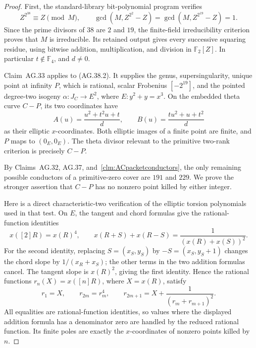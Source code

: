 \begin{proof}
First, the standard-library bit-polynomial program
 verifies
\[
 Z^{2^{38}}\equiv Z\pmod M,
 \qquad
 \gcd(M,Z^{2^2}-Z)=\gcd(M,Z^{2^{19}}-Z)=1.
                                                               \tag{AG.38.3}
\]
Since the prime divisors of \(38\) are \(2\) and \(19\),
the finite-field irreducibility criterion proves that \(M\) is
irreducible. Its retained output gives every successive squaring
residue, using bitwise addition, multiplication, and division in
\(\mathbb F_2[Z]\). In particular \(t\notin\mathbb F_4\),
and \(d\ne0\).

Claim~AG.33 applies to (AG.38.2). It supplies the genus,
supersingularity, unique point at infinity \(P\), which is rational,
scalar Frobenius
\([-2^{19}]\), and the pointed degree-two isogeny
\(\alpha:J_C\to E^2\), where \(E:y^2+y=x^3\). On the
embedded theta curve \(C-P\), its two coordinates have
\[
 A(u)=\frac{u^2+t^2u+t}{d},\qquad
 B(u)=\frac{tu^2+u+t^2}{d}                              \tag{AG.38.4}
\]
as their elliptic \(x\)-coordinates. Both elliptic images of a
finite point are finite, and \(P\) maps to \((0_E,0_E)\).
The theta divisor relevant to the primitive two-rank criterion
is precisely \(C-P\).

By Claims~AG.32, AG.37, and~\ref{clm:ACpacketconductors}, the
only remaining possible conductors of a primitive-zero cover are
\(191\) and \(229\). We prove the stronger assertion that
\(C-P\) has no nonzero point killed by either integer.

Here is a direct characteristic-two verification of the elliptic
torsion polynomials used in that test. On \(E\), the tangent
and chord formulas give the rational-function identities
\[
 x([2]R)=x(R)^4,
 \qquad
 x(R+S)+x(R-S)=\frac{1}{(x(R)+x(S))^2}.
                                                               \tag{AG.38.5}
\]
For the second identity, replacing \(S=(x_S,y_S)\) by
\(-S=(x_S,y_S+1)\) changes the chord slope by
\(1/(x_R+x_S)\); the other terms in the two addition formulas
cancel. The tangent slope is \(x(R)^2\), giving the first
identity. Hence the rational functions \(r_n(X)=x([n]R)\),
where \(X=x(R)\), satisfy
\[
 r_1=X,\qquad r_{2m}=r_m^4,\qquad
 r_{2m+1}=X+\frac{1}{(r_m+r_{m+1})^2}.             \tag{AG.38.6}
\]
All equalities are rational-function identities, so values where
the displayed addition formula has a denominator zero are
handled by the reduced rational function. Its finite poles are
exactly the \(x\)-coordinates of nonzero points killed by \(n\).


\end{proof}
